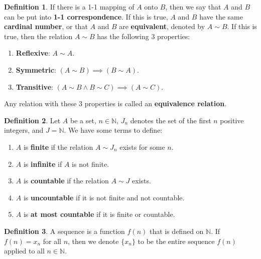 \documentclass[12pt]{article}
\theoremstyle{definition}
\newtheorem{definition}{Definition}
\theoremstyle{named}
\newcounter{customDef}
\begin{document}
\setcounter{customDef}{0}
\renewcommand{\thedefinition}{2.3}
\begin{definition}
    If there is a 1-1 mapping of $A$ onto $B$, then we say that $A$ and $B$ can be put into \textbf{1-1 correspondence}. If this is true, $A$ and $B$ have the same \textbf{cardinal number}, or that $A$ and $B$ are \textbf{equivalent}, denoted by $A \sim B$. If this is true, then the relation $A \sim B$ has the following 3 properties: 
    \begin{enumerate}
        \item \textbf{Reflexive}: $A \sim A$.
        \item \textbf{Symmetric}: $(A \sim B) \implies (B \sim A)$.
        \item \textbf{Transitive}: $(A \sim B \land B \sim C) \implies (A \sim C)$. 
    \end{enumerate}
    Any relation with these 3 properties is called an \textbf{equivalence relation}. 
\end{definition}

\setcounter{customDef}{0}
\renewcommand{\thedefinition}{2.4}
\begin{definition}
    Let $A$ be a set, $n \in \mathbb{N}$, $J_n$ denotes the set of the first $n$ positive integers, and $J = \mathbb{N}$. We have some terms to define: 
    \begin{enumerate}
        \item $A$ is \textbf{finite} if the relation $A \sim J_n$ exists for some $n$.
        \item $A$ is \textbf{infinite} if $A$ is not finite. 
        \item $A$ is \textbf{countable} if the relation $A \sim J$ exists. 
        \item $A$ is \textbf{uncountable} if it is not finite and not countable. 
        \item $A$ is \textbf{at most countable} if it is finite or countable. 
    \end{enumerate}
\end{definition}

\setcounter{customDef}{0}
\renewcommand{\thedefinition}{2.7}
\begin{definition}
    A sequence is a function $f(n)$ that is defined on $\mathbb{N}$. If $f(n) = x_n$ for all $n$, then we denote $\{x_n\}$ to be the entire sequence $f(n)$ applied to all $n \in \mathbb{N}$. 
\end{definition}
\end{document}
